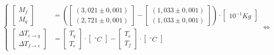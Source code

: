 \documentclass[a4paper]{article}
\begin{document}
			\[
			\begin{cases}
			\left[\begin{array}{c}
				M_{f}\\
				M_{q}
			\end{array}\right] & =\left(\left[\begin{array}{c}
					\left(3,021\pm0,001\right)\\
					\left(2,721\pm0,001\right)
				\end{array}\right]-\left[\begin{array}{c}
					\left(1,033\pm0,001\right)\\
					\left(1,033\pm0,001\right)
			\end{array}\right]\right)\cdot\left[\begin{array}{c}
				10^{-1}\unit{Kg}\end{array}\right]\\
			\left[\begin{array}{c}
				\Delta T_{e\rightarrow q}\\
				\Delta T_{f\rightarrow e}
			\end{array}\right] & =\left[\begin{array}{c}
				T_{q}\\
				T_{e}
			\end{array}\right]\cdot\left[\begin{array}{c}
				\unit{^{\circ}C}\end{array}\right]-\left[\begin{array}{c}
				T_{e}\\
				T_{f}
			\end{array}\right]\cdot\left[\begin{array}{c}
				\unit{^{\circ}C}\end{array}\right]
			\end{cases}\Longleftrightarrow
			\]
\end{document}
